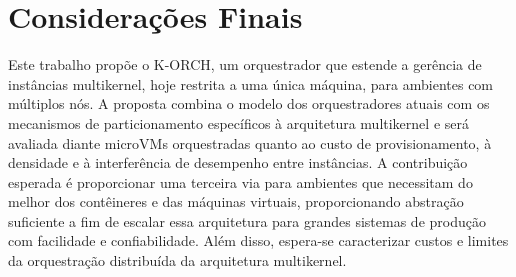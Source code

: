 \documentclass[12pt]{article}
\begin{document}
\section{Considerações Finais} \label{sec:cons-final}

Este trabalho propõe o K-ORCH, um orquestrador que estende a gerência de instâncias multikernel, hoje restrita a uma
única máquina, para ambientes com múltiplos nós.
A proposta combina o modelo dos orquestradores atuais com
os mecanismos de particionamento específicos à arquitetura multikernel e será avaliada diante microVMs orquestradas quanto ao
custo de provisionamento, à densidade e à interferência de desempenho entre instâncias.
A contribuição esperada é proporcionar uma terceira via para ambientes que necessitam do melhor dos contêineres e das
máquinas virtuais, proporcionando abstração suficiente a fim de escalar essa arquitetura para grandes sistemas de produção
com facilidade e confiabilidade.
Além disso, espera-se caracterizar custos e limites da orquestração distribuída da arquitetura multikernel.




\end{document}

